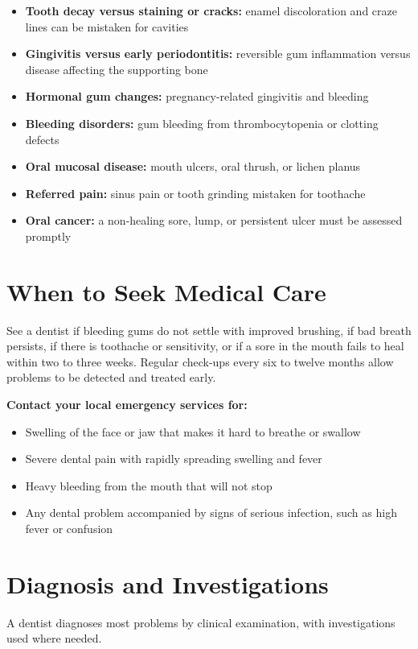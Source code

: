 \begin{itemize}
    \item \textbf{Tooth decay versus staining or cracks:} enamel discoloration and craze lines can be mistaken for cavities
    \item \textbf{Gingivitis versus early periodontitis:} reversible gum inflammation versus disease affecting the supporting bone
    \item \textbf{Hormonal gum changes:} pregnancy-related gingivitis and bleeding
    \item \textbf{Bleeding disorders:} gum bleeding from thrombocytopenia or clotting defects
    \item \textbf{Oral mucosal disease:} mouth ulcers, oral thrush, or lichen planus
    \item \textbf{Referred pain:} sinus pain or tooth grinding mistaken for toothache
    \item \textbf{Oral cancer:} a non-healing sore, lump, or persistent ulcer must be assessed promptly
\end{itemize}

\section*{When to Seek Medical Care}
See a dentist if bleeding gums do not settle with improved brushing, if bad breath persists, if there is toothache or sensitivity, or if a sore in the mouth fails to heal within two to three weeks. Regular check-ups every six to twelve months allow problems to be detected and treated early.

\textbf{Contact your local emergency services for:}
\begin{itemize}
    \item Swelling of the face or jaw that makes it hard to breathe or swallow
    \item Severe dental pain with rapidly spreading swelling and fever
    \item Heavy bleeding from the mouth that will not stop
    \item Any dental problem accompanied by signs of serious infection, such as high fever or confusion
\end{itemize}

\section*{Diagnosis and Investigations}
A dentist diagnoses most problems by clinical examination, with investigations used where needed.

